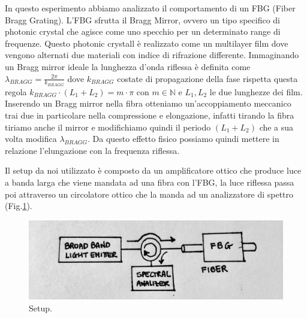 
In questo esperimento abbiamo analizzato il comportamento di un FBG (Fiber Bragg Grating). L'FBG sfrutta il Bragg Mirror, ovvero un tipo specifico di photonic crystal che agisce come uno specchio per un determinato range di frequenze. Questo photonic crystall è realizzato come un multilayer film dove vengono alternati due materiali con indice di rifrazione differente. Immaginando un Bragg mirror ideale la lunghezza d'onda riflessa è definita come $\lambda_{BRAGG} = \frac{2\pi}{k_{BRAGG}}$ dove $k_{BRAGG}$ costate di propagazione della fase rispetta questa regola $k_{BRAGG} \cdot (L_1 + L_2) = m \cdot \pi$ con $m \in \mathbb{N}$ e $L_1, L_2$ le due lunghezze dei film. Inserendo un Bragg mirror nella fibra otteniamo un'accoppiamento meccanico trai due in particolare nella compressione e elongazione, infatti tirando la fibra tiriamo anche il mirror e modifichiamo quindi il periodo $(L_1 + L_2)$ che a sua volta modifica $\lambda_{BRAGG}$. Da questo effetto fisico possiamo quindi mettere in relazione l'elungazione con la frequenza riflessa.

Il setup da noi utilizzato è composto da un amplificatore ottico che produce luce a banda larga che viene mandata ad una fibra con l'FBG, la luce riflessa passa poi attraverso un circolatore ottico che la manda ad un analizzatore di spettro (Fig.\ref{fig:setup}).
\begin{figure}[h]
    \centering
    \includegraphics[scale=0.3]{img/setup.jpg}
    \caption{Setup.}
    \label{fig:setup}
  \end{figure}

